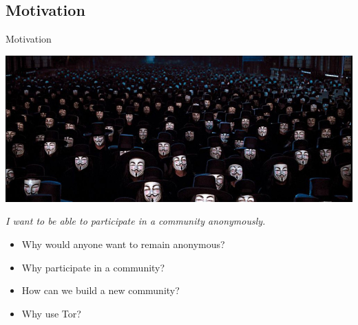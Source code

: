 \documentclass{beamer}
\begin{document}
\subsection{Motivation}
\begin{frame}{Motivation}
\begin{center}
\includegraphics[width=.9\textwidth]{vfv-crowd.jpg}
\end{center}

\emph{I want to be able to participate in a community anonymously.}

\begin{itemize}
\pause
\item Why would anyone want to remain anonymous?

\pause
\item Why participate in a community?

\pause
\item How can we build a new community?

\pause
\item Why use Tor?
\end{itemize}
\end{frame}
\end{document}
